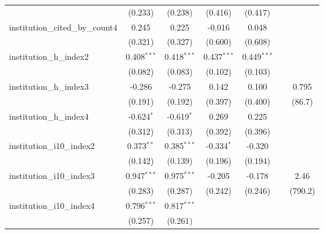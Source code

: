 \begin{tabular}{lcccccc}
                                         & (0.233)       & (0.238)        & (0.416)       & (0.417)       &                &   \\   
   institution\_cited\_by\_count4        & 0.245         & 0.225          & -0.016        & 0.048         &                &   \\   
                                         & (0.321)       & (0.327)        & (0.600)       & (0.608)       &                &   \\   
   institution\_h\_index2                & 0.408$^{***}$ & 0.418$^{***}$  & 0.437$^{***}$ & 0.449$^{***}$ &                &   \\   
                                         & (0.082)       & (0.083)        & (0.102)       & (0.103)       &                &   \\   
   institution\_h\_index3                & -0.286        & -0.275         & 0.142         & 0.100         &                & 0.795\\   
                                         & (0.191)       & (0.192)        & (0.397)       & (0.400)       &                & (86.7)\\   
   institution\_h\_index4                & -0.624$^{*}$  & -0.619$^{*}$   & 0.269         & 0.225         &                &   \\   
                                         & (0.312)       & (0.313)        & (0.392)       & (0.396)       &                &   \\   
   institution\_i10\_index2              & 0.373$^{**}$  & 0.385$^{***}$  & -0.334$^{*}$  & -0.320        &                &   \\   
                                         & (0.142)       & (0.139)        & (0.196)       & (0.194)       &                &   \\   
   institution\_i10\_index3              & 0.947$^{***}$ & 0.975$^{***}$  & -0.205        & -0.178        &                & 2.46\\   
                                         & (0.283)       & (0.287)        & (0.242)       & (0.246)       &                & (790.2)\\   
   institution\_i10\_index4              & 0.796$^{***}$ & 0.817$^{***}$  &               &               &                &   \\   
                                         & (0.257)       & (0.261)        &               &               &                &   \\   

\end{tabular}

